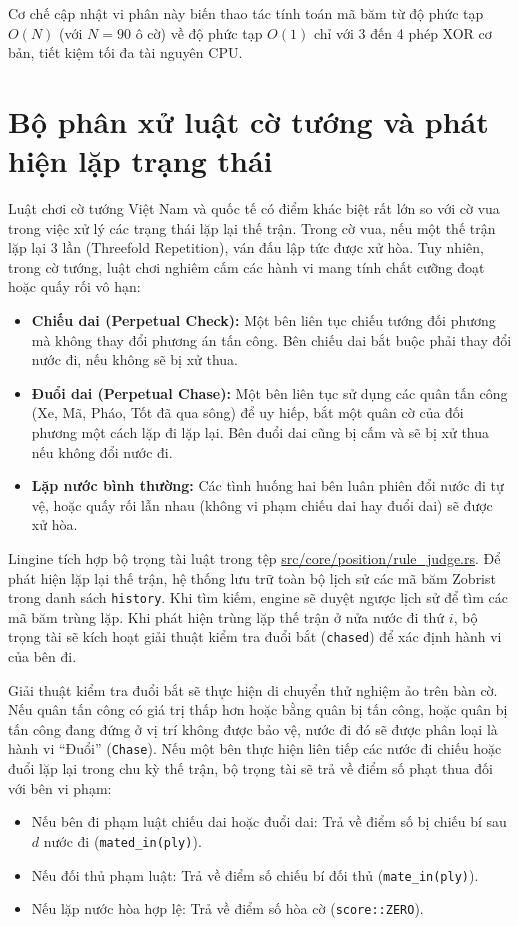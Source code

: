 Cơ chế cập nhật vi phân này biến thao tác tính toán mã băm từ độ phức tạp $O(N)$ (với $N=90$ ô cờ) về độ phức tạp $O(1)$ chỉ với 3 đến 4 phép XOR cơ bản, tiết kiệm tối đa tài nguyên CPU.

\section{Bộ phân xử luật cờ tướng và phát hiện lặp trạng thái}

Luật chơi cờ tướng Việt Nam và quốc tế có điểm khác biệt rất lớn so với cờ vua trong việc xử lý các trạng thái lặp lại thế trận. Trong cờ vua, nếu một thế trận lặp lại 3 lần (Threefold Repetition), ván đấu lập tức được xử hòa. Tuy nhiên, trong cờ tướng, luật chơi nghiêm cấm các hành vi mang tính chất cưỡng đoạt hoặc quấy rối vô hạn:
\begin{itemize}
    \item \textbf{Chiếu dai (Perpetual Check):} Một bên liên tục chiếu tướng đối phương mà không thay đổi phương án tấn công. Bên chiếu dai bắt buộc phải thay đổi nước đi, nếu không sẽ bị xử thua.
    \item \textbf{Đuổi dai (Perpetual Chase):} Một bên liên tục sử dụng các quân tấn công (Xe, Mã, Pháo, Tốt đã qua sông) để uy hiếp, bắt một quân cờ của đối phương một cách lặp đi lặp lại. Bên đuổi dai cũng bị cấm và sẽ bị xử thua nếu không đổi nước đi.
    \item \textbf{Lặp nước bình thường:} Các tình huống hai bên luân phiên đổi nước đi tự vệ, hoặc quấy rối lẫn nhau (không vi phạm chiếu dai hay đuổi dai) sẽ được xử hòa.
\end{itemize}

Lingine tích hợp bộ trọng tài luật trong tệp \url{src/core/position/rule\_judge.rs}. Để phát hiện lặp lại thế trận, hệ thống lưu trữ toàn bộ lịch sử các mã băm Zobrist trong danh sách \texttt{history}. Khi tìm kiếm, engine sẽ duyệt ngược lịch sử để tìm các mã băm trùng lặp. Khi phát hiện trùng lặp thế trận ở nửa nước đi thứ $i$, bộ trọng tài sẽ kích hoạt giải thuật kiểm tra đuổi bắt (\texttt{chased}) để xác định hành vi của bên đi.

Giải thuật kiểm tra đuổi bắt sẽ thực hiện di chuyển thử nghiệm ảo trên bàn cờ. Nếu quân tấn công có giá trị thấp hơn hoặc bằng quân bị tấn công, hoặc quân bị tấn công đang đứng ở vị trí không được bảo vệ, nước đi đó sẽ được phân loại là hành vi ``Đuổi'' (\texttt{Chase}). Nếu một bên thực hiện liên tiếp các nước đi chiếu hoặc đuổi lặp lại trong chu kỳ thế trận, bộ trọng tài sẽ trả về điểm số phạt thua đối với bên vi phạm:
\begin{itemize}
    \item Nếu bên đi phạm luật chiếu dai hoặc đuổi dai: Trả về điểm số bị chiếu bí sau $d$ nước đi (\texttt{mated\_in(ply)}).
    \item Nếu đối thủ phạm luật: Trả về điểm số chiếu bí đối thủ (\texttt{mate\_in(ply)}).
    \item Nếu lặp nước hòa hợp lệ: Trả về điểm số hòa cờ (\texttt{score::ZERO}).
\end{itemize}

